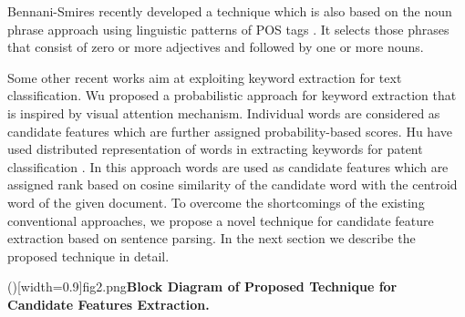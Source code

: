 \documentclass{ieeeaccess}
\begin{document}
Bennani-Smires \headeretal \hspace{0.75 mm} recently developed a technique which is also based on the noun phrase approach using linguistic patterns of POS tags \cite{b26}. It selects those phrases that consist of zero or more adjectives and followed by one or more nouns.

Some other recent works aim at exploiting keyword extraction for text classification. Wu \headeretal \cite{b27} proposed a probabilistic approach for keyword extraction that is inspired by visual attention mechanism. Individual words are  considered as candidate features which are further assigned probability-based scores. Hu \headeretal have used  distributed representation of words in extracting keywords for patent classification \cite{b28}. In this approach words  are used as candidate features which are assigned rank based on cosine similarity of the candidate word with the centroid word of the given document. To overcome the shortcomings of the existing conventional approaches, we propose a novel  technique for candidate feature extraction based on sentence parsing. In the next section we describe the proposed technique in detail.

\Figure[!h] ()[width=0.9\linewidth]{fig2.png}{\textbf{Block Diagram of Proposed Technique for Candidate Features
Extraction.\label{fig:f2}}}
\end{document}
